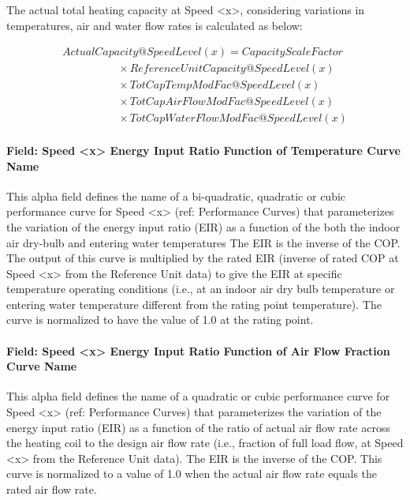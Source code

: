 The actual total heating capacity at Speed \textless{}x\textgreater{}, considering variations in temperatures, air and water flow rates is calculated as below:

\begin{equation}
  \begin{array}{l}
    ActualCapacity@SpeedLevel\left( x \right) = CapacityScaleFactor \\
    \quad \quad \quad \quad \quad \times ReferenceUnitCapacity@SpeedLevel(x) \\
    \quad \quad \quad \quad \quad \times TotCapTempModFac@SpeedLevel(x) \\
    \quad \quad \quad \quad \quad \times TotCapAirFlowModFac@SpeedLevel(x) \\
    \quad \quad \quad \quad \quad \times TotCapWaterFlowModFac@SpeedLevel(x)
  \end{array}
\end{equation}

\paragraph{Field: Speed \textless{}x\textgreater{} Energy Input Ratio Function of Temperature Curve Name}\label{field-speed-x-energy-input-ratio-function-of-temperature-curve-name-5}

This alpha field defines the name of a bi-quadratic, quadratic or cubic performance curve for Speed \textless{}x\textgreater{} (ref: Performance Curves) that parameterizes the variation of the energy input ratio (EIR) as a function of the both the indoor air dry-bulb and entering water temperatures The EIR is the inverse of the COP. The output of this curve is multiplied by the rated EIR (inverse of rated COP at Speed \textless{}x\textgreater{} from the Reference Unit data) to give the EIR at specific temperature operating conditions (i.e., at an indoor air dry bulb temperature or entering water temperature different from the rating point temperature). The curve is normalized to have the value of 1.0 at the rating point.

\paragraph{Field: Speed \textless{}x\textgreater{} Energy Input Ratio Function of Air Flow Fraction Curve Name}\label{field-speed-x-energy-input-ratio-function-of-air-flow-fraction-curve-name-3}

This alpha field defines the name of a quadratic or cubic performance curve for Speed \textless{}x\textgreater{} (ref: Performance Curves) that parameterizes the variation of the energy input ratio (EIR) as a function of the ratio of actual air flow rate across the heating coil to the design air flow rate (i.e., fraction of full load flow, at Speed \textless{}x\textgreater{} from the Reference Unit data). The EIR is the inverse of the COP. This curve is normalized to a value of 1.0 when the actual air flow rate equals the rated air flow rate.

